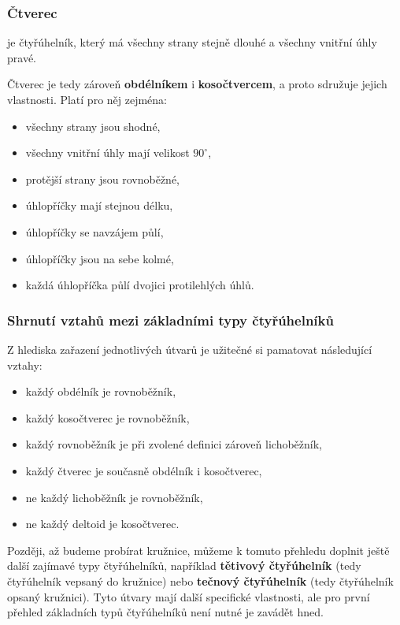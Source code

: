 \documentclass[12pt,a4paper]{article}
\begin{document}
\subsubsection{Čtverec}

\begin{definitionbox}
 je čtyřúhelník, který má všechny strany stejně dlouhé a všechny vnitřní úhly pravé.
\end{definitionbox}

Čtverec je tedy zároveň \textbf{obdélníkem} i \textbf{kosočtvercem}, a proto sdružuje jejich
vlastnosti. Platí pro něj zejména:

\begin{itemize}
    \item všechny strany jsou shodné,
    \item všechny vnitřní úhly mají velikost $90^\circ$,
    \item protější strany jsou rovnoběžné,
    \item úhlopříčky mají stejnou délku,
    \item úhlopříčky se navzájem půlí,
    \item úhlopříčky jsou na sebe kolmé,
    \item každá úhlopříčka půlí dvojici protilehlých úhlů.
\end{itemize}

\subsubsection{Shrnutí vztahů mezi základními typy čtyřúhelníků}

Z hlediska zařazení jednotlivých útvarů je užitečné si pamatovat následující vztahy:

\begin{itemize}
    \item každý obdélník je rovnoběžník,
    \item každý kosočtverec je rovnoběžník,
    \item každý rovnoběžník je při zvolené definici zároveň lichoběžník,
    \item každý čtverec je současně obdélník i kosočtverec,
    \item ne každý lichoběžník je rovnoběžník,
    \item ne každý deltoid je kosočtverec.
\end{itemize}

\begin{notebox}
Později, až budeme probírat kružnice, můžeme k tomuto přehledu doplnit ještě další
zajímavé typy čtyřúhelníků, například \textbf{tětivový čtyřúhelník} (tedy čtyřúhelník
vepsaný do kružnice) nebo \textbf{tečnový čtyřúhelník} (tedy čtyřúhelník opsaný kružnici).
Tyto útvary mají další specifické vlastnosti, ale pro první přehled základních typů
čtyřúhelníků není nutné je zavádět hned.
\end{notebox}
\end{document}
